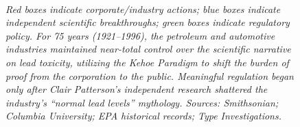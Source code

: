 \documentclass[
]{article}
\begin{document}
\begin{figure}[ht]
\\[0.45em]
\parbox{\linewidth}{\raggedright\small\emph{Red boxes indicate corporate/industry actions; blue boxes indicate independent scientific breakthroughs; green boxes indicate regulatory policy. For 75 years (1921--1996), the petroleum and automotive industries maintained near-total control over the scientific narrative on lead toxicity, utilizing the Kehoe Paradigm to shift the burden of proof from the corporation to the public. Meaningful regulation began only after Clair Patterson's independent research shattered the industry's ``normal lead levels'' mythology. Sources: Smithsonian; Columbia University; EPA historical records; Type Investigations.}}
\end{figure}
\end{document}
